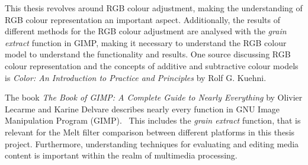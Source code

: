 \documentclass[../MasterThesis.tex]{subfiles}
\begin{document}
	
	\begin{description}[font=\color{RedViolet!80!black}, style=nextline]
		
		\item[RGB representation] 
		
		This thesis revolves around RGB colour adjustment, making the understanding of RGB colour representation an important aspect. Additionally, the results of different methods for the RGB colour adjustment are analysed with the \textit{grain extract} function in GIMP, making it necessary to understand the RGB colour model to understand the functionality and results.
		One source discussing RGB colour representation and the concepts of additive and subtractive colour models is \textit{Color: An Introduction to Practice and Principles} by Rolf G. Kuehni.~\cite{colourRGB} 
		
		
		
		
				
		
		\item[GIMP]
		
		
		The book \textit{The Book of GIMP: A Complete Guide to Nearly Everything} by Olivier Lecarme and Karine Delvare describes nearly every function in GNU Image Manipulation Program (GIMP).~\cite{gimp} 
		This includes the \textit{grain extract} function, that is relevant for the Melt filter comparison between different platforms in this thesis project.
		Furthermore, understanding techniques for evaluating and editing media content is important within the realm of multimedia processing.
		
		
		
		
		
		\item[Colour grading] 
		

\end{description}
\end{document}
